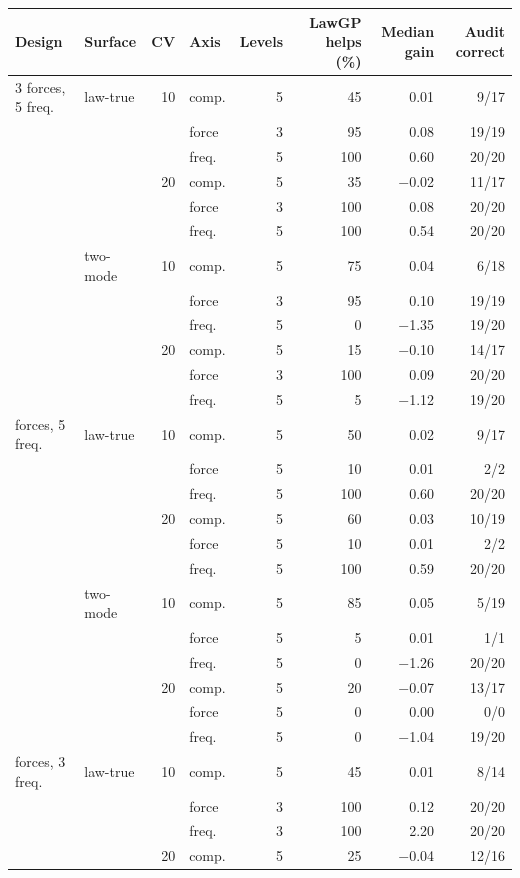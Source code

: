 \begin{tabular}{l l r l r r r r}
\toprule
Design & Surface & CV & Axis & Levels & LawGP helps (\%) & Median gain & Audit correct \\
\midrule
3 forces, 5 freq. & law-true & 10 & comp. & 5 & 45 & 0.01 & 9/17 \\
 &  &  & force & 3 & 95 & 0.08 & 19/19 \\
 &  &  & freq. & 5 & 100 & 0.60 & 20/20 \\
 &  & 20 & comp. & 5 & 35 & $-$0.02 & 11/17 \\
 &  &  & force & 3 & 100 & 0.08 & 20/20 \\
 &  &  & freq. & 5 & 100 & 0.54 & 20/20 \\
 & two-mode & 10 & comp. & 5 & 75 & 0.04 & 6/18 \\
 &  &  & force & 3 & 95 & 0.10 & 19/19 \\
 &  &  & freq. & 5 & 0 & $-$1.35 & 19/20 \\
 &  & 20 & comp. & 5 & 15 & $-$0.10 & 14/17 \\
 &  &  & force & 3 & 100 & 0.09 & 20/20 \\
 &  &  & freq. & 5 & 5 & $-$1.12 & 19/20 \\
\addlinespace
5 forces, 5 freq. & law-true & 10 & comp. & 5 & 50 & 0.02 & 9/17 \\
 &  &  & force & 5 & 10 & 0.01 & 2/2 \\
 &  &  & freq. & 5 & 100 & 0.60 & 20/20 \\
 &  & 20 & comp. & 5 & 60 & 0.03 & 10/19 \\
 &  &  & force & 5 & 10 & 0.01 & 2/2 \\
 &  &  & freq. & 5 & 100 & 0.59 & 20/20 \\
 & two-mode & 10 & comp. & 5 & 85 & 0.05 & 5/19 \\
 &  &  & force & 5 & 5 & 0.01 & 1/1 \\
 &  &  & freq. & 5 & 0 & $-$1.26 & 20/20 \\
 &  & 20 & comp. & 5 & 20 & $-$0.07 & 13/17 \\
 &  &  & force & 5 & 0 & 0.00 & 0/0 \\
 &  &  & freq. & 5 & 0 & $-$1.04 & 19/20 \\
\addlinespace
3 forces, 3 freq. & law-true & 10 & comp. & 5 & 45 & 0.01 & 8/14 \\
 &  &  & force & 3 & 100 & 0.12 & 20/20 \\
 &  &  & freq. & 3 & 100 & 2.20 & 20/20 \\
 &  & 20 & comp. & 5 & 25 & $-$0.04 & 12/16 \\

\end{tabular}
